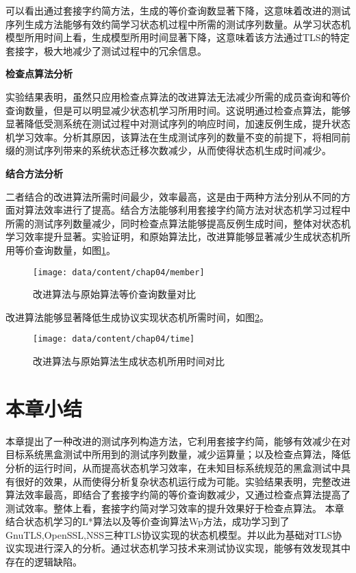 可以看出通过套接字约简方法，生成的等价查询数显著下降，这意味着改进的测试序列生成方法能够有效约简学习状态机过程中所需的测试序列数量。从学习状态机模型所用时间上看，生成模型所用时间显著下降，这意味着该方法通过TLS的特定套接字，极大地减少了测试过程中的冗余信息。


\textbf{检查点算法分析}

实验结果表明，虽然只应用检查点算法的改进算法无法减少所需的成员查询和等价查询数量，但是可以明显减少状态机学习所用时间。这说明通过检查点算法，能够显著降低受测系统在测试过程中对测试序列的响应时间，加速反例生成，提升状态机学习效率。分析其原因，该算法在生成测试序列的数量不变的前提下，将相同前缀的测试序列带来的系统状态迁移次数减少，从而使得状态机生成时间减少。

\textbf{结合方法分析}

二者结合的改进算法所需时间最少，效率最高，这是由于两种方法分别从不同的方面对算法效率进行了提高。结合方法能够利用套接字约简方法对状态机学习过程中所需的测试序列数量减少，同时检查点算法能够提高反例生成时间，整体对状态机学习效率提升显著。实验证明，和原始算法比，改进算能够显著减少生成状态机所用等价查询数量，如图\ref{fig-member}。

\begin{figure}[htp]
	\centering
	\texttt{[image: data/content/chap04/member]}
	\caption{改进算法与原始算法等价查询数量对比}
	\label{fig-member}
\end{figure}

改进算法能够显著降低生成协议实现状态机所需时间，如图\ref{fig-time}。

\begin{figure}[htp]
	\centering
	\texttt{[image: data/content/chap04/time]}
	\caption{改进算法与原始算法生成状态机所用时间对比}
	\label{fig-time}
\end{figure}







\section{本章小结}


本章提出了一种改进的测试序列构造方法，它利用套接字约简，能够有效减少在对目标系统黑盒测试中所用到的测试序列数量，减少运算量；以及检查点算法，降低分析的运行时间，从而提高状态机学习效率，在未知目标系统规范的黑盒测试中具有很好的效果，从而使得分析复杂状态机运行成为可能。实验结果表明，完整改进算法效率最高，即结合了套接字约简的等价查询数减少，又通过检查点算法提高了测试效率。整体上看，套接字约简对学习效率的提升效果好于检查点算法。
本章结合状态机学习的L*算法以及等价查询算法Wp方法，成功学习到了GnuTLS,OpenSSL,NSS三种TLS协议实现的状态机模型。并以此为基础对TLS协议实现进行深入的分析。通过状态机学习技术来测试协议实现，能够有效发现其中存在的逻辑缺陷。
